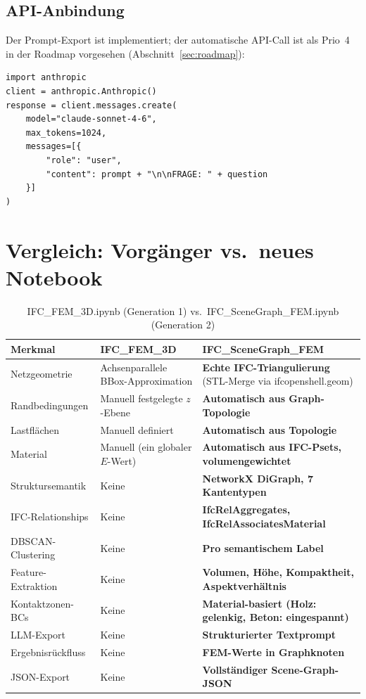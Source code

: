 \documentclass[a4paper,11pt]{article}
\begin{document}
\subsection{API-Anbindung}

Der Prompt-Export ist implementiert; der automatische API-Call ist als Prio~4 in der Roadmap vorgesehen (Abschnitt~\ref{sec:roadmap}):

\begin{lstlisting}[caption={Geplante Claude-API-Anbindung (Prio 4)}]
import anthropic
client = anthropic.Anthropic()
response = client.messages.create(
    model="claude-sonnet-4-6",
    max_tokens=1024,
    messages=[{
        "role": "user",
        "content": prompt + "\n\nFRAGE: " + question
    }]
)
\end{lstlisting}

\section{Vergleich: Vorgänger vs.\ neues Notebook}

\begin{table}[H]
\centering
\caption{IFC\_FEM\_3D.ipynb (Generation 1) vs.\ IFC\_SceneGraph\_FEM.ipynb (Generation 2)}
\begin{tabular}{p{3.5cm}p{4.5cm}p{5.5cm}}
\toprule
\textbf{Merkmal} & \textbf{IFC\_FEM\_3D} & \textbf{IFC\_SceneGraph\_FEM} \\
\midrule
Netzgeometrie & Achsenparallele BBox-Approximation & \textbf{Echte IFC-Triangulierung} (STL-Merge via ifcopenshell.geom) \\
Randbedingungen & Manuell festgelegte $z$-Ebene & \textbf{Automatisch aus Graph-Topologie} \\
Lastflächen & Manuell definiert & \textbf{Automatisch aus Topologie} \\
Material & Manuell (ein globaler $E$-Wert) & \textbf{Automatisch aus IFC-Psets, volumengewichtet} \\
Struktursemantik & Keine & \textbf{NetworkX DiGraph, 7 Kantentypen} \\
IFC-Relationships & Keine & \textbf{IfcRelAggregates, IfcRelAssociatesMaterial} \\
DBSCAN-Clustering & Keine & \textbf{Pro semantischem Label} \\
Feature-Extraktion & Keine & \textbf{Volumen, Höhe, Kompaktheit, Aspektverhältnis} \\
Kontaktzonen-BCs & Keine & \textbf{Material-basiert (Holz: gelenkig, Beton: eingespannt)} \\
LLM-Export & Keine & \textbf{Strukturierter Textprompt} \\
Ergebnisrückfluss & Keine & \textbf{FEM-Werte in Graphknoten} \\
JSON-Export & Keine & \textbf{Vollständiger Scene-Graph-JSON} \\
\bottomrule
\end{tabular}
\end{table}
\end{document}
